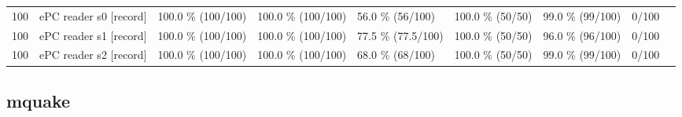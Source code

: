 \documentclass[10pt,a4paper]{article}
\begin{document}
\begin{center}
\begin{tabularx}{\textwidth}{@{}p{}XXXXXXXX@{}}
100 & ePC reader s0 [record] & 100.0 \% (100/100) & 100.0 \% (100/100) & 56.0 \% (56/100) & 100.0 \% (50/50) & 99.0 \% (99/100) & 0/100 &  \\
100 & ePC reader s1 [record] & 100.0 \% (100/100) & 100.0 \% (100/100) & 77.5 \% (77.5/100) & 100.0 \% (50/50) & 96.0 \% (96/100) & 0/100 &  \\
100 & ePC reader s2 [record] & 100.0 \% (100/100) & 100.0 \% (100/100) & 68.0 \% (68/100) & 100.0 \% (50/50) & 99.0 \% (99/100) & 0/100 &  \\
\bottomrule
\end{tabularx}
\end{center}



\subsection*{mquake}
\end{document}
